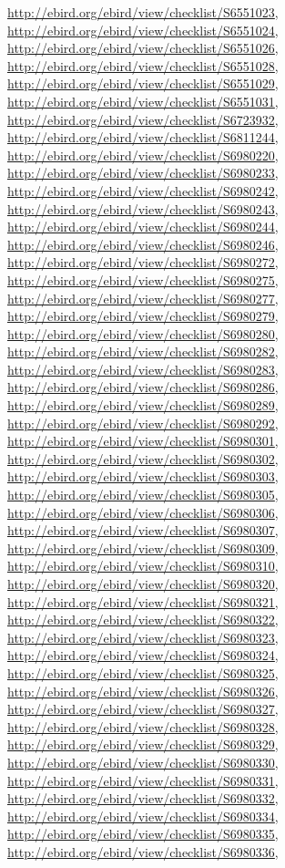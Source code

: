 \documentclass[9pt, article]{memoir}
\begin{document}
\begin{multicols}{2}
\url{http://ebird.org/ebird/view/checklist/S6551023}, 
\url{http://ebird.org/ebird/view/checklist/S6551024}, 
\url{http://ebird.org/ebird/view/checklist/S6551026}, 
\url{http://ebird.org/ebird/view/checklist/S6551028}, 
\url{http://ebird.org/ebird/view/checklist/S6551029}, 
\url{http://ebird.org/ebird/view/checklist/S6551031}, 
\url{http://ebird.org/ebird/view/checklist/S6723932}, 
\url{http://ebird.org/ebird/view/checklist/S6811244}, 
\url{http://ebird.org/ebird/view/checklist/S6980220}, 
\url{http://ebird.org/ebird/view/checklist/S6980233}, 
\url{http://ebird.org/ebird/view/checklist/S6980242}, 
\url{http://ebird.org/ebird/view/checklist/S6980243}, 
\url{http://ebird.org/ebird/view/checklist/S6980244}, 
\url{http://ebird.org/ebird/view/checklist/S6980246}, 
\url{http://ebird.org/ebird/view/checklist/S6980272}, 
\url{http://ebird.org/ebird/view/checklist/S6980275}, 
\url{http://ebird.org/ebird/view/checklist/S6980277}, 
\url{http://ebird.org/ebird/view/checklist/S6980279}, 
\url{http://ebird.org/ebird/view/checklist/S6980280}, 
\url{http://ebird.org/ebird/view/checklist/S6980282}, 
\url{http://ebird.org/ebird/view/checklist/S6980283}, 
\url{http://ebird.org/ebird/view/checklist/S6980286}, 
\url{http://ebird.org/ebird/view/checklist/S6980289}, 
\url{http://ebird.org/ebird/view/checklist/S6980292}, 
\url{http://ebird.org/ebird/view/checklist/S6980301}, 
\url{http://ebird.org/ebird/view/checklist/S6980302}, 
\url{http://ebird.org/ebird/view/checklist/S6980303}, 
\url{http://ebird.org/ebird/view/checklist/S6980305}, 
\url{http://ebird.org/ebird/view/checklist/S6980306}, 
\url{http://ebird.org/ebird/view/checklist/S6980307}, 
\url{http://ebird.org/ebird/view/checklist/S6980309}, 
\url{http://ebird.org/ebird/view/checklist/S6980310}, 
\url{http://ebird.org/ebird/view/checklist/S6980320}, 
\url{http://ebird.org/ebird/view/checklist/S6980321}, 
\url{http://ebird.org/ebird/view/checklist/S6980322}, 
\url{http://ebird.org/ebird/view/checklist/S6980323}, 
\url{http://ebird.org/ebird/view/checklist/S6980324}, 
\url{http://ebird.org/ebird/view/checklist/S6980325}, 
\url{http://ebird.org/ebird/view/checklist/S6980326}, 
\url{http://ebird.org/ebird/view/checklist/S6980327}, 
\url{http://ebird.org/ebird/view/checklist/S6980328}, 
\url{http://ebird.org/ebird/view/checklist/S6980329}, 
\url{http://ebird.org/ebird/view/checklist/S6980330}, 
\url{http://ebird.org/ebird/view/checklist/S6980331}, 
\url{http://ebird.org/ebird/view/checklist/S6980332}, 
\url{http://ebird.org/ebird/view/checklist/S6980334}, 
\url{http://ebird.org/ebird/view/checklist/S6980335}, 
\url{http://ebird.org/ebird/view/checklist/S6980336}, 

\end{multicols}
\end{document}

